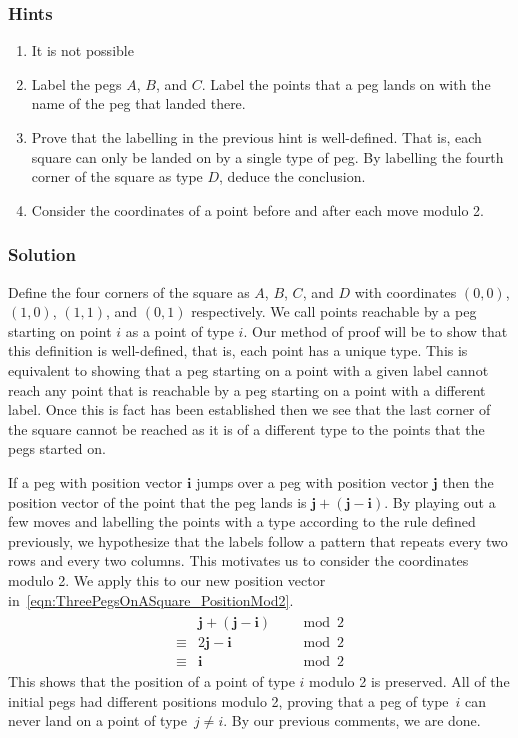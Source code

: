 \subsubsection{Hints}

\begin{enumerate}
	\item It is not possible
	\item Label the pegs $A$, $B$, and $C$. Label the points that a peg lands on with the name of the peg that landed there.
	\item Prove that the labelling in the previous hint is well-defined. That is, each square can only be landed on by a single type of peg. By labelling the fourth corner of the square as type $D$, deduce the conclusion.
	\item Consider the coordinates of a point before and after each move modulo 2.
\end{enumerate}

\subsubsection{Solution}

Define the four corners of the square as $A$, $B$, $C$, and $D$ with coordinates $(0, 0)$, $(1, 0)$, $(1, 1)$, and $(0, 1)$ respectively. We call points reachable by a peg starting on point $i$ as a point of type $i$. Our method of proof will be to show that this definition is well-defined, that is, each point has a unique type. This is equivalent to showing that a peg starting on a point with a given label cannot reach any point that is reachable by a peg starting on a point with a different label. Once this is fact has been established then we see that the last corner of the square cannot be reached as it is of a different type to the points that the pegs started on.

If a peg with position vector $\mathbf{i}$ jumps over a peg with position vector $\mathbf{j}$ then the position vector of the point that the peg lands is $\mathbf{j} + (\mathbf{j} - \mathbf{i})$. By playing out a few moves and labelling the points with a type according to the rule defined previously, we hypothesize that the labels follow a pattern that repeats every two rows and every two columns. This motivates us to consider the coordinates modulo 2. We apply this to our new position vector in~\eqref{eqn:ThreePegsOnASquare_PositionMod2}.
\begin{alignat}
	\begin{split}
		& \mathbf{j} + (\mathbf{j} - \mathbf{i}) & & \mod 2 \\
		\equiv{} & 2\mathbf{j} - \mathbf{i} & & \mod 2 \\
		\equiv{} & \mathbf{i} & & \mod 2
	\end{split}
	\label{eqn:ThreePegsOnASquare_PositionMod2}
\end{alignat}
This shows that the position of a point of type $i$ modulo 2 is preserved. All of the initial pegs had different positions modulo 2, proving that a peg of type~$i$ can never land on a point of type~$j \ne i$. By our previous comments, we are done.

